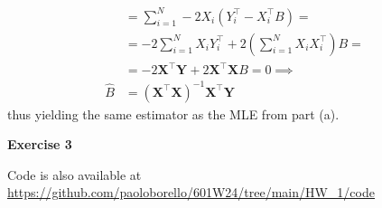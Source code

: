 \documentclass[10pt,notitlepage]{article}
\newcommand{\MBlue}[1]{{\color{MBlue}#1}}
\newcommand{\Xv}{\mathbf{X}}
\newcommand{\Yv}{\mathbf{Y}}
\begin{document}
\begin{exercise}[Solution]
\begin{enumerate}[(a)]
\begin{align*}
                        &= \sum_{i=1}^{N}-2 X_i \left(Y_i^\top - X_i^\top B\right) = \\
                        &= -2\sum_{i=1}^{N}X_i Y_i^\top + 2 \left(\sum_{i=1}^{N} X_i X_i^\top\right) B = \\
                        &= -2 \Xv^\top\Yv + 2 \Xv^\top\Xv B = 0 \implies\\
                        \hat{B} &= \left(\Xv^\top\Xv\right)^{-1}\Xv^\top\Yv
                    \end{align*}
                    thus yielding the same estimator as the MLE from part (a).
        \end{enumerate}
    \end{exercise}

    \newpage
    \textbf{\large \MBlue{Exercise 3}}
    \vskip10pt
    \noindent
	\begin{exercise}[Solution]
        Code is also available at \url{https://github.com/paoloborello/601W24/tree/main/HW_1/code}
    \end{exercise}
\end{document}
